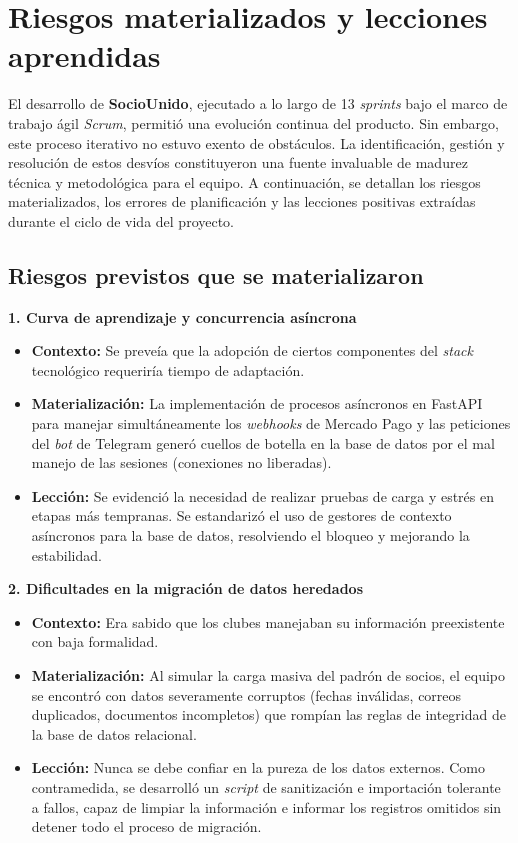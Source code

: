 \section{Riesgos materializados y lecciones aprendidas}

El desarrollo de \textbf{SocioUnido}, ejecutado a lo largo de 13 \textit{sprints} bajo el marco de trabajo ágil \textit{Scrum}, permitió una evolución continua del producto. Sin embargo, este proceso iterativo no estuvo exento de obstáculos. La identificación, gestión y resolución de estos desvíos constituyeron una fuente invaluable de madurez técnica y metodológica para el equipo. A continuación, se detallan los riesgos materializados, los errores de planificación y las lecciones positivas extraídas durante el ciclo de vida del proyecto.

\subsection{Riesgos previstos que se materializaron}

\textbf{1. Curva de aprendizaje y concurrencia asíncrona}
\begin{itemize}
    \item \textbf{Contexto:} Se preveía que la adopción de ciertos componentes del \textit{stack} tecnológico requeriría tiempo de adaptación.
    \item \textbf{Materialización:} La implementación de procesos asíncronos en FastAPI para manejar simultáneamente los \textit{webhooks} de Mercado Pago y las peticiones del \textit{bot} de Telegram generó cuellos de botella en la base de datos por el mal manejo de las sesiones (conexiones no liberadas).
    \item \textbf{Lección:} Se evidenció la necesidad de realizar pruebas de carga y estrés en etapas más tempranas. Se estandarizó el uso de gestores de contexto asíncronos para la base de datos, resolviendo el bloqueo y mejorando la estabilidad.
\end{itemize}

\textbf{2. Dificultades en la migración de datos heredados}
\begin{itemize}
    \item \textbf{Contexto:} Era sabido que los clubes manejaban su información preexistente con baja formalidad.
    \item \textbf{Materialización:} Al simular la carga masiva del padrón de socios, el equipo se encontró con datos severamente corruptos (fechas inválidas, correos duplicados, documentos incompletos) que rompían las reglas de integridad de la base de datos relacional.
    \item \textbf{Lección:} Nunca se debe confiar en la pureza de los datos externos. Como contramedida, se desarrolló un \textit{script} de sanitización e importación tolerante a fallos, capaz de limpiar la información e informar los registros omitidos sin detener todo el proceso de migración.
\end{itemize}

